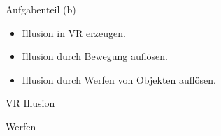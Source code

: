 \documentclass{beamer}
\begin{document}
\begin{frame}{Aufgabenteil (b)}
\begin{itemize}
\item Illusion in VR erzeugen.
\item Illusion durch Bewegung auflösen.
\item Illusion durch Werfen von Objekten auflösen.
\end{itemize}
\end{frame}


\begin{frame}{VR Illusion}
    \centering
\end{frame}


\begin{frame}{Werfen}
    \centering
\end{frame}


	
    	
    	
    	
\end{document}
